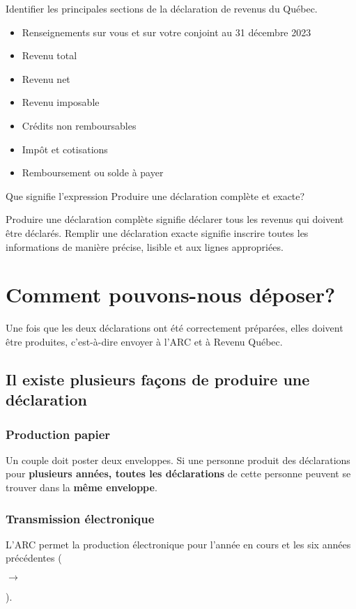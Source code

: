 \begin{question}
	Identifier les principales sections de la déclaration de revenus du Québec.
\end{question}
\begin{itemize}
	\item Renseignements sur vous et  sur votre conjoint au 31 décembre 2023
	\item Revenu total
	\item Revenu net
	\item Revenu imposable
	\item Crédits non remboursables
	\item Impôt et cotisations
	\item Remboursement ou solde à payer
\end{itemize}

\begin{question}
	Que signifie l'expression \og Produire une déclaration complète et exacte\fg{}?
\end{question}
Produire une déclaration complète signifie déclarer tous les revenus qui doivent être déclarés. Remplir une déclaration exacte signifie inscrire toutes les informations de manière précise, lisible et aux lignes appropriées.



\section{Comment pouvons-nous déposer?}
\begin{intro}
	Une fois que les deux déclarations ont été correctement préparées, elles doivent être produites, c'est-à-dire envoyer à l'ARC et à Revenu Québec.
\end{intro}


\subsection{Il existe plusieurs façons de produire une déclaration}
\subsubsection{Production papier}
Un couple doit poster deux enveloppes. Si une personne produit des déclarations pour \textbf{plusieurs années, toutes les déclarations} de cette personne peuvent se trouver dans la \textbf{même enveloppe}.

\subsubsection{Transmission électronique}
\setcounter{annee}{2023}
L'ARC permet la production électronique pour l'année en cours et les six années précédentes (\addtocounter{annee}{-6}\theannee{} $\rightarrow$ \addtocounter{annee}{6}\theannee{}).

